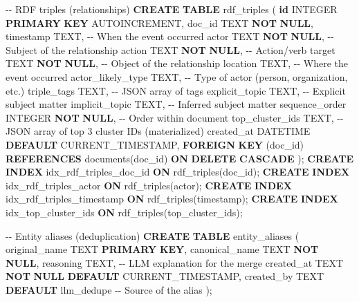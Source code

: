 \documentclass[
  italian,
  a4paper,
]{article}
\newenvironment{Shaded}{\begin{snugshade}}{\end{snugshade}}
\newcommand{\CommentTok}[1]{\textcolor[rgb]{0.37,0.37,0.37}{#1}}
\newcommand{\DataTypeTok}[1]{\textcolor[rgb]{0.68,0.00,0.00}{#1}}
\newcommand{\FunctionTok}[1]{\textcolor[rgb]{0.28,0.35,0.67}{#1}}
\newcommand{\KeywordTok}[1]{\textcolor[rgb]{0.00,0.23,0.31}{\textbf{#1}}}
\newcommand{\NormalTok}[1]{\textcolor[rgb]{0.00,0.23,0.31}{#1}}
\newcommand{\StringTok}[1]{\textcolor[rgb]{0.13,0.47,0.30}{#1}}
\begin{document}
\begin{Shaded}
\begin{Highlighting}[]
\CommentTok{{-}{-} RDF triples (relationships)}
\KeywordTok{CREATE} \KeywordTok{TABLE}\NormalTok{ rdf\_triples (}
  \KeywordTok{id} \DataTypeTok{INTEGER} \KeywordTok{PRIMARY} \KeywordTok{KEY}\NormalTok{ AUTOINCREMENT,}
\NormalTok{  doc\_id TEXT }\KeywordTok{NOT} \KeywordTok{NULL}\NormalTok{,}
  \DataTypeTok{timestamp}\NormalTok{ TEXT,                         }\CommentTok{{-}{-} When the event occurred}
\NormalTok{  actor TEXT }\KeywordTok{NOT} \KeywordTok{NULL}\NormalTok{,                    }\CommentTok{{-}{-} Subject of the relationship}
\NormalTok{  action TEXT }\KeywordTok{NOT} \KeywordTok{NULL}\NormalTok{,                   }\CommentTok{{-}{-} Action/verb}
\NormalTok{  target TEXT }\KeywordTok{NOT} \KeywordTok{NULL}\NormalTok{,                   }\CommentTok{{-}{-} Object of the relationship}
\NormalTok{  location TEXT,                          }\CommentTok{{-}{-} Where the event occurred}
\NormalTok{  actor\_likely\_type TEXT,                 }\CommentTok{{-}{-} Type of actor (person, organization, etc.)}
\NormalTok{  triple\_tags TEXT,                       }\CommentTok{{-}{-} JSON array of tags}
\NormalTok{  explicit\_topic TEXT,                    }\CommentTok{{-}{-} Explicit subject matter}
\NormalTok{  implicit\_topic TEXT,                    }\CommentTok{{-}{-} Inferred subject matter}
\NormalTok{  sequence\_order }\DataTypeTok{INTEGER} \KeywordTok{NOT} \KeywordTok{NULL}\NormalTok{,        }\CommentTok{{-}{-} Order within document}
\NormalTok{  top\_cluster\_ids TEXT,                   }\CommentTok{{-}{-} JSON array of top 3 cluster IDs (materialized)}
\NormalTok{  created\_at DATETIME }\KeywordTok{DEFAULT} \FunctionTok{CURRENT\_TIMESTAMP}\NormalTok{,}
  \KeywordTok{FOREIGN} \KeywordTok{KEY}\NormalTok{ (doc\_id) }\KeywordTok{REFERENCES}\NormalTok{ documents(doc\_id) }\KeywordTok{ON} \KeywordTok{DELETE} \KeywordTok{CASCADE}
\NormalTok{);}
\KeywordTok{CREATE} \KeywordTok{INDEX}\NormalTok{ idx\_rdf\_triples\_doc\_id }\KeywordTok{ON}\NormalTok{ rdf\_triples(doc\_id);}
\KeywordTok{CREATE} \KeywordTok{INDEX}\NormalTok{ idx\_rdf\_triples\_actor }\KeywordTok{ON}\NormalTok{ rdf\_triples(actor);}
\KeywordTok{CREATE} \KeywordTok{INDEX}\NormalTok{ idx\_rdf\_triples\_timestamp }\KeywordTok{ON}\NormalTok{ rdf\_triples(}\DataTypeTok{timestamp}\NormalTok{);}
\KeywordTok{CREATE} \KeywordTok{INDEX}\NormalTok{ idx\_top\_cluster\_ids }\KeywordTok{ON}\NormalTok{ rdf\_triples(top\_cluster\_ids);}

\CommentTok{{-}{-} Entity aliases (deduplication)}
\KeywordTok{CREATE} \KeywordTok{TABLE}\NormalTok{ entity\_aliases (}
\NormalTok{  original\_name TEXT }\KeywordTok{PRIMARY} \KeywordTok{KEY}\NormalTok{,}
\NormalTok{  canonical\_name TEXT }\KeywordTok{NOT} \KeywordTok{NULL}\NormalTok{,}
\NormalTok{  reasoning TEXT,                         }\CommentTok{{-}{-} LLM explanation for the merge}
\NormalTok{  created\_at TEXT }\KeywordTok{NOT} \KeywordTok{NULL} \KeywordTok{DEFAULT} \FunctionTok{CURRENT\_TIMESTAMP}\NormalTok{,}
\NormalTok{  created\_by TEXT }\KeywordTok{DEFAULT} \StringTok{\textquotesingle{}llm\_dedupe\textquotesingle{}}    \CommentTok{{-}{-} Source of the alias}
\NormalTok{);}
\end{Highlighting}
\end{Shaded}
\end{document}
